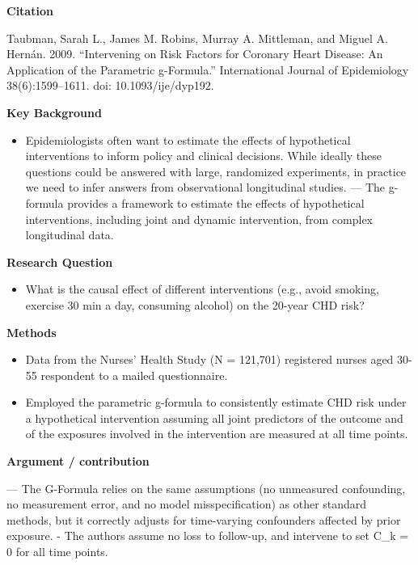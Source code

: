 \documentclass[
]{book}
\providecommand{\tightlist}{%
  \setlength{\itemsep}{0pt}\setlength{\parskip}{0pt}}
\begin{document}
\textbf{Citation}

Taubman, Sarah L., James M. Robins, Murray A. Mittleman, and Miguel A. Hernán. 2009. ``Intervening on Risk Factors for Coronary Heart Disease: An Application of the Parametric g-Formula.'' International Journal of Epidemiology 38(6):1599--1611. doi: 10.1093/ije/dyp192.

\textbf{Key Background}

\begin{itemize}
\tightlist
\item
  Epidemiologists often want to estimate the effects of hypothetical interventions to inform policy and clinical decisions. While ideally these questions could be answered with large, randomized experiments, in practice we need to infer answers from observational longitudinal studies.
  --- The g-formula provides a framework to estimate the effects of hypothetical interventions, including joint and dynamic intervention, from complex longitudinal data.
\end{itemize}

\textbf{Research Question}

\begin{itemize}
\tightlist
\item
  What is the causal effect of different interventions (e.g., avoid smoking, exercise 30 min a day, consuming alcohol) on the 20-year CHD risk?
\end{itemize}

\textbf{Methods}

\begin{itemize}
\tightlist
\item
  Data from the Nurses' Health Study (N = 121,701) registered nurses aged 30-55 respondent to a mailed questionnaire.
\item
  Employed the parametric g-formula to consistently estimate CHD risk under a hypothetical intervention assuming all joint predictors of the outcome and of the exposures involved in the intervention are measured at all time points.
\end{itemize}

\textbf{Argument / contribution}

--- The G-Formula relies on the same assumptions (no unmeasured confounding, no measurement error, and no model misspecification) as other standard methods, but it correctly adjusts for time-varying confounders affected by prior exposure.
- The authors assume no loss to follow-up, and intervene to set C\_k = 0 for all time points.
\end{document}
